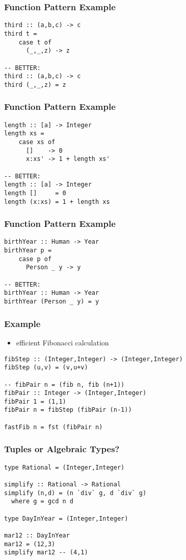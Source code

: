 \documentclass[dvipsnames]{beamer}
\theoremstyle{plain}
\begin{document}
\begin{frame}[fragile]
  \frametitle{Function Pattern Example}

  \begin{lstlisting}
third :: (a,b,c) -> c
third t =
    case t of
      (_,_,z) -> z

-- BETTER:
third :: (a,b,c) -> c
third (_,_,z) = z
  \end{lstlisting}
\end{frame}

\begin{frame}[fragile]
  \frametitle{Function Pattern Example}

  \begin{lstlisting}
length :: [a] -> Integer
length xs =
    case xs of
      []    -> 0
      x:xs' -> 1 + length xs'

-- BETTER:
length :: [a] -> Integer
length []     = 0
length (x:xs) = 1 + length xs
  \end{lstlisting}
\end{frame}

\begin{frame}[fragile]
  \frametitle{Function Pattern Example}

  \begin{lstlisting}
birthYear :: Human -> Year
birthYear p =
    case p of
      Person _ y -> y

-- BETTER:
birthYear :: Human -> Year
birthYear (Person _ y) = y
  \end{lstlisting}
\end{frame}

\begin{frame}[fragile]
  \frametitle{Example}

  \begin{itemize}
    \item efficient Fibonacci calculation
  \end{itemize}

  \begin{lstlisting}
fibStep :: (Integer,Integer) -> (Integer,Integer)
fibStep (u,v) = (v,u+v)

-- fibPair n = (fib n, fib (n+1))
fibPair :: Integer -> (Integer,Integer)
fibPair 1 = (1,1)
fibPair n = fibStep (fibPair (n-1))

fastFib n = fst (fibPair n)
  \end{lstlisting}
\end{frame}

\begin{frame}[fragile]
  \frametitle{Tuples or Algebraic Types?}

  \begin{lstlisting}
type Rational = (Integer,Integer)

simplify :: Rational -> Rational
simplify (n,d) = (n `div` g, d `div` g)
  where g = gcd n d

type DayInYear = (Integer,Integer)

mar12 :: DayInYear
mar12 = (12,3)
simplify mar12 -- (4,1)
  \end{lstlisting}
\end{frame}
\end{document}
